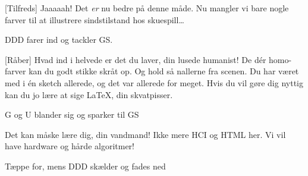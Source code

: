\documentclass[a4paper,11pt]{article}
\begin{document}
\begin{sketch}
  [Tilfreds] Jaaaaah! Det \emph{er} nu bedre på denne måde.
  Nu mangler vi bare nogle farver til at illustrere sindstilstand hos
  skuespill\ldots
  
  \scene DDD farer ind og tackler GS.
  
  [Råber] Hvad ind i helvede er det du laver, din lusede
  humanist! De dér homo-farver kan du godt stikke skråt op. Og hold så
  nallerne fra scenen. Du har været med i én sketch allerede, og det
  var allerede for meget. Hvis du vil gøre dig nyttig kan du jo lære
  at sige \LaTeX , din skvatpisser.
  
  \scene G og U blander sig og sparker til GS
  
   Det kan måske lære dig, din vandmand! Ikke mere HCI og
  HTML her. Vi vil have hardware og hårde algoritmer! 
  
  \scene Tæppe for, mens DDD skælder og fades ned
\end{sketch}
\end{document}
